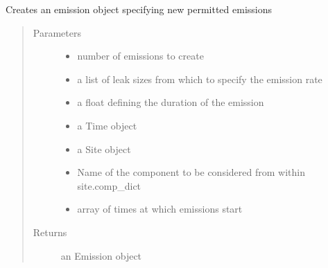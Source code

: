\documentclass[letterpaper,10pt,english]{sphinxmanual}
\begin{document}
\begin{fulllineitems}
\label{\detokenize{index:feast.EmissionSimModules.emission_class_functions.permitted_emission}}
Creates an emission object specifying new permitted emissions
\begin{quote}\begin{description}
\item[{Parameters}] \leavevmode\begin{itemize}
\item {} 
 \textendash{} number of emissions to create

\item {} 
 \textendash{} a list of leak sizes from which to specify the emission rate

\item {} 
 \textendash{} a float defining the duration of the emission

\item {} 
 \textendash{} a Time object

\item {} 
 \textendash{} a Site object

\item {} 
 \textendash{} Name of the component to be considered from within site.comp\_dict

\item {} 
 \textendash{} array of times at which emissions start

\end{itemize}

\item[{Returns}] \leavevmode
an Emission object

\end{description}\end{quote}

\end{fulllineitems}
\end{document}
